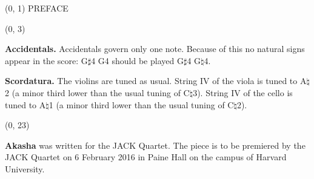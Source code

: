\documentclass[10pt]{article}
\begin{document}
\begin{textblock}{23}(0, 1)
\center \huge PREFACE
\end{textblock}

\begin{textblock}{23}(0, 3)

\textbf{Accidentals.} Accidentals govern only one note. Because of this no
natural signs appear in the score: G$\sharp$4 G4 should be played G$\sharp$4
G$\natural$4.

\textbf{Scordatura.} The violins are tuned as usual. String IV of the viola is
tuned to A$\natural$2 (a minor third lower than the usual tuning of
C$\natural$3). String IV of the cello is tuned to A$\natural$1 (a minor third
lower than the usual tuning of C$\natural$2).

\end{textblock}

\begin{textblock}{23}(0, 23)

\textbf{Akasha} was written for the JACK Quartet. The piece is to be premiered
by the JACK Quartet on 6 February 2016 in Paine Hall on the campus of Harvard
University.

\end{textblock}
\end{document}
